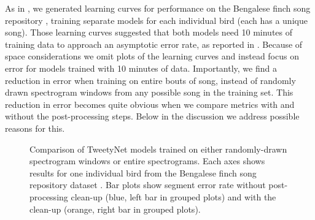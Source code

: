 As in \cite{cohenAutomatedAnnotationBirdsong2022}, we generated learning curves for performance on the Bengalese finch song repository \cite{BengaleseFinchSong2017}, training separate models for each individual bird (each has a unique song). Those learning curves suggested that both models need 10 minutes of training data to approach an asymptotic error rate, as reported in \cite{cohenAutomatedAnnotationBirdsong2022}. Because of space considerations we omit plots of the learning curves and instead focus on error for models trained with 10 minutes of data. Importantly, we find a reduction in error when training on entire bouts of song, instead of randomly drawn spectrogram windows from any possible song in the training set. This reduction in error becomes quite obvious when we compare metrics with and without the post-processing steps.
Below in the discussion we address possible reasons for this.

\begin{figure}[]
    \noindent
    \caption{Comparison of TweetyNet models trained on either randomly-drawn spectrogram windows or entire spectrograms. Each axes shows results for one individual bird from the Bengalese finch song repository dataset \cite{BengaleseFinchSong2017}. Bar plots show segment error rate without post-processing clean-up (blue, left bar in grouped plots) and with the clean-up (orange, right bar in grouped plots). \label{fig:compare-tweetynets}}
\end{figure}

